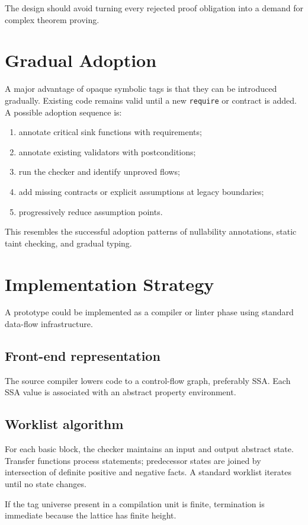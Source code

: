 \documentclass[11pt]{article}
\begin{document}
The design should avoid turning every rejected proof obligation into a demand for complex theorem proving.

\section{Gradual Adoption}
A major advantage of opaque symbolic tags is that they can be introduced gradually. Existing code remains valid until a new \texttt{require} or contract is added. A possible adoption sequence is:

\begin{enumerate}
  \item annotate critical sink functions with requirements;
  \item annotate existing validators with postconditions;
  \item run the checker and identify unproved flows;
  \item add missing contracts or explicit assumptions at legacy boundaries;
  \item progressively reduce assumption points.
\end{enumerate}

This resembles the successful adoption patterns of nullability annotations, static taint checking, and gradual typing.

\section{Implementation Strategy}
A prototype could be implemented as a compiler or linter phase using standard data-flow infrastructure.

\subsection{Front-end representation}
The source compiler lowers code to a control-flow graph, preferably SSA. Each SSA value is associated with an abstract property environment.

\subsection{Worklist algorithm}
For each basic block, the checker maintains an input and output abstract state. Transfer functions process statements; predecessor states are joined by intersection of definite positive and negative facts. A standard worklist iterates until no state changes.

If the tag universe present in a compilation unit is finite, termination is immediate because the lattice has finite height.
\end{document}
